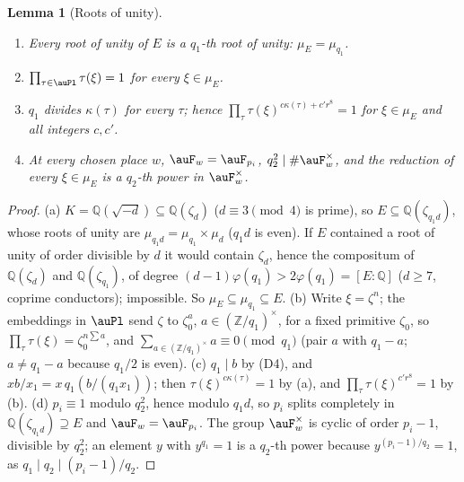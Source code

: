 \documentclass[10pt]{amsart}
\newtheorem{lemma}[theorem]{Lemma}
\theoremstyle{definition}
\theoremstyle{remark}
\newcommand{\Z}{\mathbb Z}
\newcommand{\Q}{\mathbb Q}
\begin{document}
\begin{lemma}[Roots of unity]\label{pfq:roots}
\begin{enumerate}
\item[(a)] Every root of unity of $E$ is a $q_1$-th root of unity: $\mu_E=\mu_{q_1}$.
\item[(b)] $\prod_{\tau\in\auPl}\tau(\xi)=1$ for every $\xi\in\mu_E$.
\item[(c)] $q_1$ divides $\kappa(\tau)$ for every $\tau$; hence $\prod_\tau\tau(\xi)^{c\kappa(\tau)+c'r^8}=1$ for $\xi\in\mu_E$ and all
integers $c,c'$.
\item[(d)] At every chosen place $w$, $\auF_w=\auF_{p_i}$, $q_2^2\mid\#\auF_w^\times$, and the reduction of every $\xi\in\mu_E$ is a
$q_2$-th power in $\auF_w^\times$.
\end{enumerate}
\end{lemma}
\begin{proof}
(a) $K=\Q(\sqrt{-d})\subseteq\Q(\zeta_d)$ ($d\equiv3\pmod4$ is prime), so $E\subseteq\Q(\zeta_{q_1d})$, whose roots of unity are
$\mu_{q_1d}=\mu_{q_1}\times\mu_d$ ($q_1d$ is even). If $E$ contained a root of unity of order divisible by $d$ it would contain
$\zeta_d$, hence the compositum of $\Q(\zeta_d)$ and $\Q(\zeta_{q_1})$, of degree $(d-1)\varphi(q_1)>2\varphi(q_1)=[E:\Q]$
($d\ge7$, coprime conductors); impossible. So $\mu_E\subseteq\mu_{q_1}\subseteq E$. (b) Write $\xi=\zeta^n$; the embeddings in
$\auPl$ send $\zeta$ to $\zeta_0^a$, $a\in(\Z/q_1)^\times$, for a fixed primitive $\zeta_0$, so $\prod_\tau\tau(\xi)=\zeta_0^{n\sum a}$, and
$\sum_{a\in(\Z/q_1)^\times}a\equiv0\pmod{q_1}$ (pair $a$ with $q_1-a$; $a\ne q_1-a$ because $q_1/2$ is even). (c) $q_1\mid b$ by (D4),
and $xb/x_1=x\,q_1(b/(q_1x_1))$; then $\tau(\xi)^{c\kappa(\tau)}=1$ by (a), and $\prod_\tau\tau(\xi)^{c'r^8}=1$ by (b). (d) $p_i\equiv1$
modulo $q_2^2$, hence modulo $q_1d$, so $p_i$ splits completely in $\Q(\zeta_{q_1d})\supseteq E$ and $\auF_w=\auF_{p_i}$. The group
$\auF_w^\times$ is cyclic of order $p_i-1$, divisible by $q_2^2$; an element $y$ with $y^{q_1}=1$ is a $q_2$-th power because
$y^{(p_i-1)/q_2}=1$, as $q_1\mid q_2\mid(p_i-1)/q_2$.
\end{proof}
\end{document}
